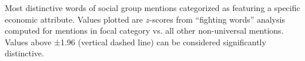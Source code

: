 Most distinctive words of social group mentions categorized as featuring a specific economic attribute. Values plotted are $z$-scores from ``fighting words'' analysis computed for mentions in focal category vs. all other non-universal mentions. Values above ±1.96 (vertical dashed line) can be considered significantly distinctive.